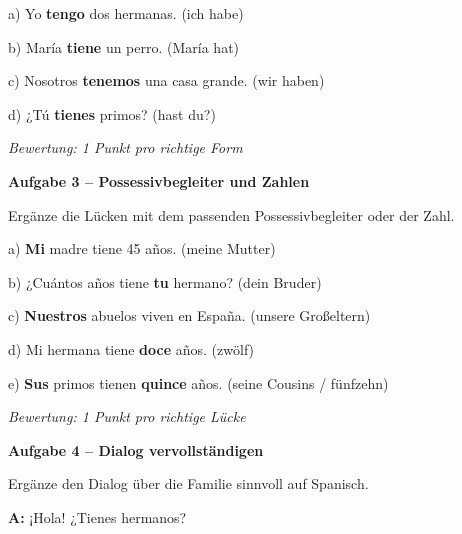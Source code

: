 \documentclass[11pt, a4paper]{article}
\newcommand{\fachfarbe}{spanisch}
\newcommand{\punktebox}[1]{\hfill\fbox{\small \_/#1}}
\newcommand{\lsg}[1]{\textcolor{loesung}{\textbf{#1}}}
\newenvironment{aufgabe}[1]{%
    \needspace{5\baselineskip}%
    \nopagebreak[4]%
    \vspace{10pt}
    \noindent\textbf{\textcolor{\fachfarbe}{Aufgabe #1}}
    \nopagebreak[4]%
    \vspace{5pt}
    \nopagebreak[4]%
    \begin{list}{}{\leftmargin=0pt}
    \item[]
}{%
    \end{list}
}
\begin{document}
\noindent
a) Yo \lsg{tengo} dos hermanas. \hfill (ich habe)

\vspace{0.8em}

\noindent
b) María \lsg{tiene} un perro. \hfill (María hat)

\vspace{0.8em}

\noindent
c) Nosotros \lsg{tenemos} una casa grande. \hfill (wir haben)

\vspace{0.8em}

\noindent
d) ¿Tú \lsg{tienes} primos? \hfill (hast du?)

\textit{\textcolor{grau}{Bewertung: 1 Punkt pro richtige Form}}

\vspace{15pt}

\begin{aufgabe}{3 -- Possessivbegleiter und Zahlen}
Ergänze die Lücken mit dem passenden Possessivbegleiter oder der Zahl. \punktebox{6}
\end{aufgabe}

\noindent
a) \lsg{Mi} madre tiene 45 años. \hfill (meine Mutter)

\vspace{0.8em}

\noindent
b) ¿Cuántos años tiene \lsg{tu} hermano? \hfill (dein Bruder)

\vspace{0.8em}

\noindent
c) \lsg{Nuestros} abuelos viven en España. \hfill (unsere Großeltern)

\vspace{0.8em}

\noindent
d) Mi hermana tiene \lsg{doce} años. \hfill (zwölf)

\vspace{0.8em}

\noindent
e) \lsg{Sus} primos tienen \lsg{quince} años. \hfill (seine Cousins / fünfzehn)

\textit{\textcolor{grau}{Bewertung: 1 Punkt pro richtige Lücke}}

\vspace{15pt}

\begin{aufgabe}{4 -- Dialog vervollständigen}
Ergänze den Dialog über die Familie sinnvoll auf Spanisch. \punktebox{6}
\end{aufgabe}

\noindent
\textbf{A:} ¡Hola! ¿Tienes hermanos?
\end{document}
